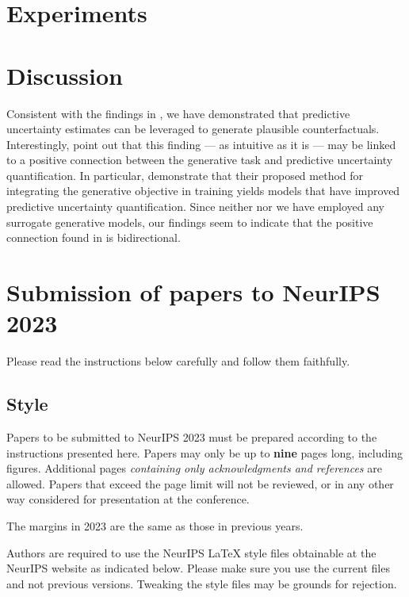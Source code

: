 \documentclass{article}
\begin{document}
\section{Experiments}

\section{Discussion}

Consistent with the findings in \citet{schut2021generating}, we have demonstrated that predictive uncertainty estimates can be leveraged to generate plausible counterfactuals. Interestingly, \citet{schut2021generating} point out that this finding --- as intuitive as it is --- may be linked to a positive connection between the generative task and predictive uncertainty quantification. In particular, \citet{grathwohl2020your} demonstrate that their proposed method for integrating the generative objective in training yields models that have improved predictive uncertainty quantification. Since neither \citet{schut2021generating} nor we have employed any surrogate generative models, our findings seem to indicate that the positive connection found in \citet{grathwohl2020your} is bidirectional.


\medskip




\section{Submission of papers to NeurIPS 2023}


Please read the instructions below carefully and follow them faithfully.


\subsection{Style}


Papers to be submitted to NeurIPS 2023 must be prepared according to the
instructions presented here. Papers may only be up to {\bf nine} pages long,
including figures. Additional pages \emph{containing only acknowledgments and
references} are allowed. Papers that exceed the page limit will not be
reviewed, or in any other way considered for presentation at the conference.


The margins in 2023 are the same as those in previous years.


Authors are required to use the NeurIPS \LaTeX{} style files obtainable at the
NeurIPS website as indicated below. Please make sure you use the current files
and not previous versions. Tweaking the style files may be grounds for
rejection.
\end{document}
